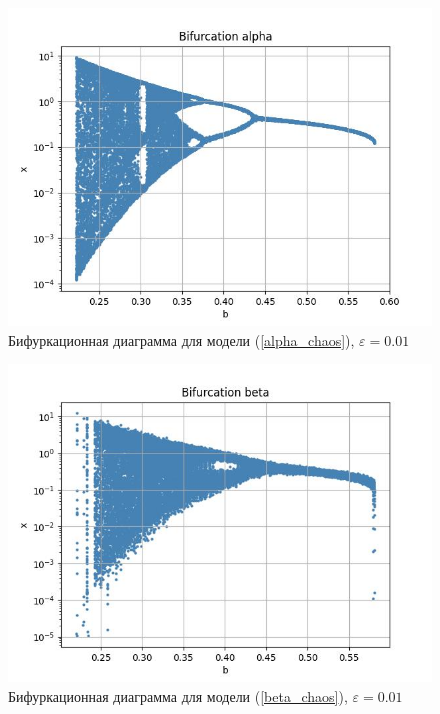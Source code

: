     \begin{figure}
        \centering
        \includegraphics[width=\textwidth]{stochastic/images/bifurcation_x_0_2_a_1_compare_alpha_noise.jpg}
        
        \captionsetup{justification=centering}
        \caption{Бифуркационная диаграмма для модели (\ref{alpha_chaos}), \(\varepsilon = 0.01\)}
        \label{bifurcation_x_0_2_a_1_compare_alpha_noise}
    \end{figure}

    \begin{figure}
        \centering
        \includegraphics[width=\textwidth]{stochastic/images/bifurcation_x_0_2_a_1_compare_beta_noise.jpg}
        
        \captionsetup{justification=centering}
        \caption{Бифуркационная диаграмма для модели (\ref{beta_chaos}), \(\varepsilon = 0.01\)}
        \label{bifurcation_x_0_2_a_1_compare_beta_noise}
    \end{figure}

